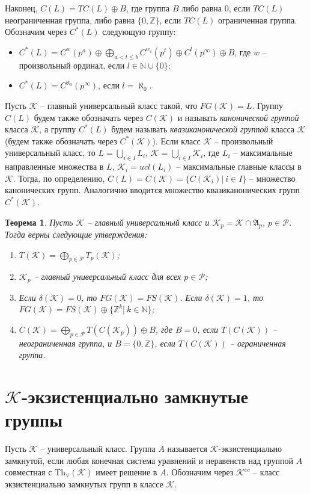 \documentclass[12pt]{extarticle} %
\newtheorem{theorem}{Теорема}[section]
\def\A{{\mathfrak{A}}}
\def\K{{\mathcal{K}}}
\def\Kec{\mathcal{K}^{ec}}
\def\P{{\mathcal{P}}}
\def\Z{{\mathbb{Z}}}
\def\N{{\mathbb{N}}}
\def\Tha{{\mathrm{Th}_\forall}}
\begin{document}
Наконец, $C(L) = TC(L) \oplus B$, где группа $B$ либо равна $0$, если $TC(L)$ неограниченная группа, либо равна $\{0, \Z\}$, если $TC(L)$ ограниченная группа. Обозначим через $C^*(L)$ следующую группу:
\begin{itemize}
\item $C^*(L) = C^{w}(p^a) \oplus \bigoplus\limits_{a < t \leq b} C^{w_t}(p^t) \oplus C^l(p^\infty) \oplus B$, где $w$ -- произвольный ординал, если $l \in \N \cup\{0\}$;
\item $C^*(L) = C^{\aleph_0}(p^\infty)$, если $l = \aleph_0$.
\end{itemize}

Пусть $\K$ -- главный универсальный класс такой, что $FG(\K) = L$. Группу $C(L)$ будем также обозначать через $C(\K)$ и называть \textit{канонической группой} класса $\K$, а группу $C^*(L)$ будем называть \textit{квазиканонической группой} класса $\K$ (будем также обозначать через $C^*(\K)$). Если класс $\K$ -- произвольный универсальный класс, то $L = \bigcup\limits_{i \in I} L_i$, $\K = \bigcup\limits_{i \in I} \K_i$, где $L_i$ -- максимальные направленные множества в $L$, $\K_i = ucl(L_i)$ -- максимальные главные классы в $\K$. Тогда, по определению, $C(L) = C(\K) = \{C(\K_i) | \ i \in I\}$ -- множество канонических групп. Аналогично вводится множество квазиканонических групп $C^*(\K)$.

\begin{theorem}
Пусть $\K$ -- главный универсальный класс и $\K_p = \K \cap \A_p$, $p \in \P$. Тогда верны следующие утверждения:
\begin{enumerate}
\item $T(\K) = \bigoplus\limits_{p \in \P} T_p(\K)$;
\item $\K_p$ -- главный универсальный класс для всех $p \in \P$;
\item Если $\delta(\K) = 0$, то $FG(\K) = FS(\K)$. Если $\delta(\K) = 1$, то $FG(\K) = FS(\K) \oplus \{\Z^k | \ k \in \N\}$;
\item $C(\K) = \bigoplus\limits_{p \in \P} T(C(\K_p)) \oplus B$, где $B = 0$, если $T(C(\K))$ -- неограниченная группа, и $B = \{0, \Z\}$, если $T(C(\K))$ -- ограниченная группа.
\end{enumerate}
\end{theorem}

\section{$\K$-экзистенциально замкнутые группы} 
Пусть $\K$ -- универсальный класс. Группа $A$ называется $\K$-экзистенциально замкнутой, если любая конечная система уравнений и неравенств над группой $A$ совместная с $\Tha(\K)$ имеет решение в $A$. Обозначим через $\Kec$ -- класс экзистенциально замкнутых групп в классе $\K$.
\end{document}
